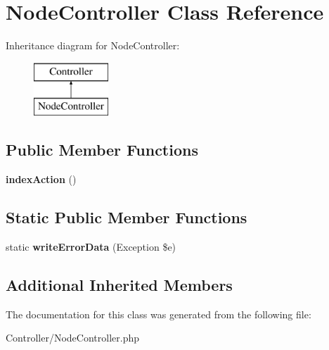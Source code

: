 \hypertarget{class_node_controller}{\section{Node\-Controller Class Reference}
\label{class_node_controller}
}
Inheritance diagram for Node\-Controller\-:\begin{figure}[H]
\begin{center}
\leavevmode
\includegraphics[height=2.000000cm]{class_node_controller}
\end{center}
\end{figure}
\subsection*{Public Member Functions}
\begin{DoxyCompactItemize}
\item 
\hypertarget{class_node_controller_a04f2101fe1cdc785b61219c2df753024}{{\bfseries index\-Action} ()}\label{class_node_controller_a04f2101fe1cdc785b61219c2df753024}

\end{DoxyCompactItemize}
\subsection*{Static Public Member Functions}
\begin{DoxyCompactItemize}
\item 
\hypertarget{class_node_controller_a2d13f67877bc056bc6798b3d0931c4a2}{static {\bfseries write\-Error\-Data} (Exception \$e)}\label{class_node_controller_a2d13f67877bc056bc6798b3d0931c4a2}

\end{DoxyCompactItemize}
\subsection*{Additional Inherited Members}


The documentation for this class was generated from the following file\-:\begin{DoxyCompactItemize}
\item 
Controller/Node\-Controller.\-php\end{DoxyCompactItemize}
